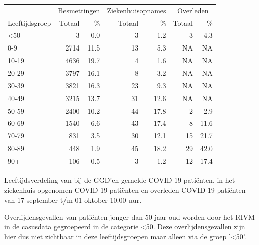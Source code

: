 \documentclass[
  english,
  man,floatsintext]{apa6}
\begin{document}
\begin{table}
\centering\begingroup\fontsize{11}{13}\selectfont

\begin{threeparttable}
\begin{tabular}{lrrrrrr}
\toprule
\multicolumn{1}{c}{ } & \multicolumn{2}{c}{Besmettingen} & \multicolumn{2}{c}{Ziekenhuisopnames} & \multicolumn{2}{c}{Overleden} \\
\cmidrule(l{3pt}r{3pt}){2-3} \cmidrule(l{3pt}r{3pt}){4-5} \cmidrule(l{3pt}r{3pt}){6-7}
Leeftijdsgroep & Totaal & \% & Totaal & \% & Totaal & \%\\
\midrule
<50 & 3 & 0.0 & 3 & 1.2 & 3 & 4.3\\
0-9 & 2714 & 11.5 & 13 & 5.3 & NA & NA\\
10-19 & 4636 & 19.7 & 4 & 1.6 & NA & NA\\
20-29 & 3797 & 16.1 & 8 & 3.2 & NA & NA\\
30-39 & 3821 & 16.3 & 23 & 9.3 & NA & NA\\
40-49 & 3215 & 13.7 & 31 & 12.6 & NA & NA\\
50-59 & 2400 & 10.2 & 44 & 17.8 & 2 & 2.9\\
60-69 & 1540 & 6.6 & 43 & 17.4 & 8 & 11.6\\
70-79 & 831 & 3.5 & 30 & 12.1 & 15 & 21.7\\
80-89 & 448 & 1.9 & 45 & 18.2 & 29 & 42.0\\
90+ & 106 & 0.5 & 3 & 1.2 & 12 & 17.4\\
\bottomrule
\end{tabular}
\begin{tablenotes}
\item[1] Leeftijdsverdeling van bij de GGD’en gemelde COVID-19 patiënten, in het ziekenhuis opgenomen COVID-19 patiënten en overleden COVID-19 patiënten van 17 september t/m 01 oktober 10:00 uur.
\item[2] Overlijdensgevallen van patiënten jonger dan 50 jaar oud worden door het RIVM in de casusdata gegroepeerd in de categorie <50. Deze overlijdensgevallen zijn hier dus niet zichtbaar in deze leeftijdsgroepen maar alleen via de groep '<50'.
\end{tablenotes}
\end{threeparttable}
\endgroup{}
\end{table}

\newpage
\end{document}
